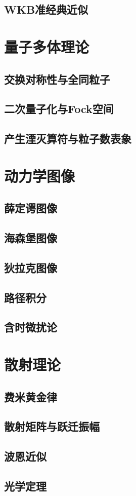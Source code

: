 \documentclass[a4paper]{report}
\begin{document}
\section{WKB准经典近似}

\chapter{量子多体理论}
\section{交换对称性与全同粒子}
\section{二次量子化与Fock空间}
\section{产生湮灭算符与粒子数表象}

\chapter{动力学图像}
\section{薛定谔图像}
\section{海森堡图像}
\section{狄拉克图像}
\section{路径积分}
\section{含时微扰论}

\chapter{散射理论}
\section{费米黄金律}
\section{散射矩阵与跃迁振幅}
\section{波恩近似}
\section{光学定理}



%
\end{document}
